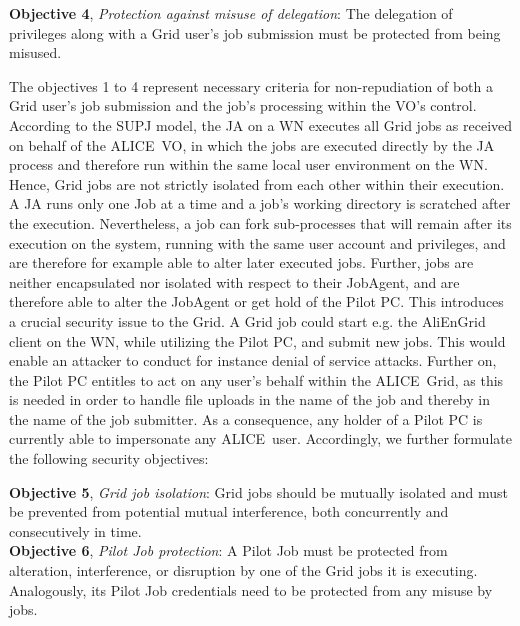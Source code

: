 \documentclass[10pt]{iopart}
\newcommand{\alice}{ALICE}
\newcommand{\alien}{AliEn}
\begin{document}
\noindent
\textbf{Objective 4}, \textit{Protection against misuse of delegation}:
The delegation of privileges along with a Grid user's job submission must be
protected from being misused.\\
\par
\endgroup\noindent
The objectives 1 to 4 represent necessary criteria for non-repudiation of
both a Grid user's job submission and the job's processing within the VO's
control.\\
According to the SUPJ model, the JA on a WN executes all Grid jobs as
received on behalf of the \alice\ VO, in which the jobs are executed directly by the JA
process and therefore run within the same local user
environment on the WN. Hence, Grid jobs are not strictly isolated from each
other within their execution. A JA runs only one Job at a time and a job's
working directory is scratched after the execution. Nevertheless, a job can fork sub-processes
that will remain after its execution on the system, running with the same user
account and privileges, and are therefore for example able to alter later
executed jobs. Further, jobs are neither encapsulated nor isolated with respect to
their JobAgent, and are therefore able to alter the JobAgent or get hold of the
Pilot PC. This introduces a crucial security issue to the Grid. A Grid job could
start e.g. the \alien Grid client on the WN, while utilizing the Pilot PC, and
submit new jobs. This would enable an attacker to conduct for instance denial of service
attacks. Further on, the Pilot PC entitles to act on any user's behalf within the
\alice\ Grid, as this is needed in order to handle file uploads in the name
of the job and thereby in the name of the job submitter. As a consequence, any
holder of a Pilot PC is currently able to impersonate any \alice\ user. 
Accordingly, we further formulate the following security objectives:\\
\par
\begingroup
\leftskip=0.4cm
\noindent
\textbf{Objective 5}, \textit{Grid job isolation}: Grid jobs should be
mutually isolated and must be prevented from potential mutual interference,
both concurrently and consecutively in time.\\

\noindent
\textbf{Objective 6}, \textit{Pilot Job protection}: A Pilot Job must be protected from alteration, 
interference, or
disruption by one of the Grid jobs it is executing. Analogously, its Pilot Job
credentials need to be protected from any misuse by jobs.\\
\end{document}
